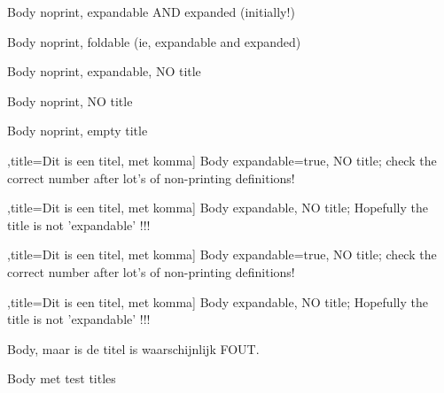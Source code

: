 \documentclass{ximera}
\begin{document}
\begin{definition}[expandable=true,expanded,title={Veelterm, expandable and expanded}]
Body noprint, expandable AND expanded (initially!)
\end{definition}

\begin{definition}[foldable=true,title={Veelterm, foldable (synonym for expandable and expanded)}]
Body noprint,  foldable (ie, expandable and expanded)
\end{definition}

\begin{definition}[print=false,expandable]
Body noprint, expandable, NO title
\end{definition}

\begin{definition}[print=false]
Body noprint,  NO title
\end{definition}

\begin{definition}[print=false,title={}]
Body noprint,  empty title
\end{definition}

\begin{definition}[expandable=true],title={Dit is een titel, met komma}]\nl
Body expandable=true, NO title; check the correct number after lot's of non-printing definitions!
\end{definition}

\begin{definition}[expandable],title={Dit is een titel, met komma}]\nl
Body expandable, NO title; Hopefully the title is not 'expandable' !!!
\end{definition}
\begin{definition}[expandable=true],title={Dit is een titel, met komma}]
Body expandable=true, NO title; check the correct number after lot's of non-printing definitions!
\end{definition}

\begin{definition}[expandable],title={Dit is een titel, met komma}]
Body expandable, NO title; Hopefully the title is not 'expandable' !!!
\end{definition}

\begin{definition}
Body, maar is de titel is waarschijnlijk FOUT. 
\end{definition}

\begin{definition}[Titel1, title={titel met toekenning aan 'titl'}, noexpandable, onbekendeoptiewordttitel]
Body met test titles
\end{definition}
\end{document}
